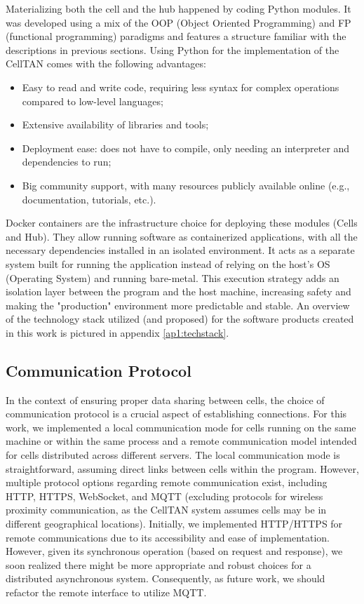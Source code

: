 Materializing both the cell and the hub happened by coding Python modules. It was developed using a mix of the OOP (Object Oriented Programming) and FP (functional programming) paradigms and features a structure familiar with the descriptions in previous sections. Using Python for the implementation of the CellTAN comes with the following advantages:

\begin{itemize}
    \item Easy to read and write code, requiring less syntax for complex operations compared to low-level languages;
    \item Extensive availability of libraries and tools;
    \item Deployment ease: does not have to compile, only needing an interpreter and dependencies to run;
    \item Big community support, with many resources publicly available online (e.g., documentation, tutorials, etc.). 
\end{itemize}


Docker containers \cite{docker} are the infrastructure choice for deploying these modules (Cells and Hub). They allow running software as containerized applications, with all the necessary dependencies installed in an isolated environment. It acts as a separate system built for running the application instead of relying on the host's OS (Operating System) and running bare-metal. This execution strategy adds an isolation layer between the program and the host machine, increasing safety and making the "production" environment more predictable and stable. An overview of the technology stack utilized (and proposed) for the software products created in this work is pictured in appendix \ref{ap1:techstack}.



\subsection{Communication Protocol}

In the context of ensuring proper data sharing between cells, the choice of communication protocol is a crucial aspect of establishing connections. For this work, we implemented a local communication mode for cells running on the same machine or within the same process and a remote communication model intended for cells distributed across different servers. The local communication mode is straightforward, assuming direct links between cells within the program. However, multiple protocol options regarding remote communication exist, including HTTP, HTTPS, WebSocket, and MQTT (excluding protocols for wireless proximity communication, as the CellTAN system assumes cells may be in different geographical locations). Initially, we implemented HTTP/HTTPS for remote communications due to its accessibility and ease of implementation. However, given its synchronous operation (based on request and response), we soon realized there might be more appropriate and robust choices for a distributed asynchronous system. Consequently, as future work, we should refactor the remote interface to utilize MQTT.


